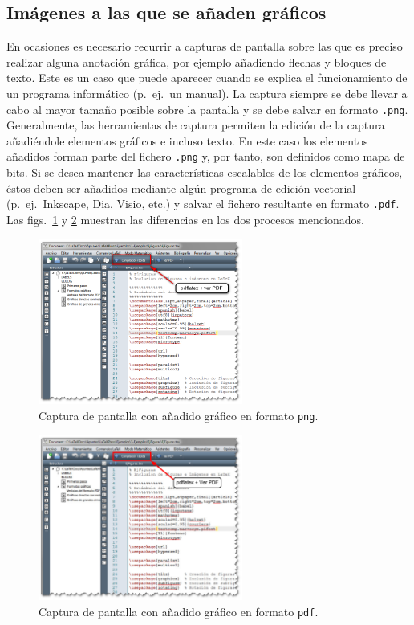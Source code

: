 \documentclass[ 		%
	11pt,				%
	a4paper,			%
	twoside,			%
	openright,			%
	final       		%
]{book}
\begin{document}
\subsection{Imágenes a las que se añaden gráficos}
En ocasiones es necesario recurrir a capturas de pantalla sobre las que es preciso realizar alguna anotación gráfica, por ejemplo añadiendo flechas y bloques de texto. Este es un caso que puede aparecer cuando se explica el funcionamiento de un programa informático (p.~ej.\ un manual). La captura siempre se debe llevar a cabo al mayor tamaño posible sobre la pantalla y se debe salvar en formato \texttt{.png}. Generalmente, las herramientas de captura permiten la edición de la captura añadiéndole elementos gráficos e incluso texto. En este caso los elementos añadidos 
forman parte del fichero \texttt{.png} y, por tanto, son definidos como mapa de bits. Si se desea mantener las características escalables de los elementos gráficos, éstos deben ser añadidos mediante algún programa de edición vectorial (p.~ej.\ 
\textsf{Inkscape}, \textsf{Dia}, \textsf{Visio}, etc.) y salvar el fichero resultante en formato \texttt{.pdf}. Las figs.~\ref{fig:texmk02} y \ref{fig:texmk03} muestran las diferencias en los dos procesos mencionados.

\begin{figure}[hbt]
	\centering
	\includegraphics[width=0.6\textwidth]{texmk02} 
	\caption[Captura con gráfico en \texttt{png}]{Captura de pantalla con añadido gráfico en formato \texttt{png}.}
	\label{fig:texmk02}
\end{figure}

\begin{figure}[hbt]
	\centering
	\includegraphics[width=0.6\textwidth]{texmk03} 
	\caption[Captura con gráfico en \texttt{pdf}]{Captura de pantalla con añadido gráfico en formato \texttt{pdf}.}
	\label{fig:texmk03}
\end{figure}
\end{document}
